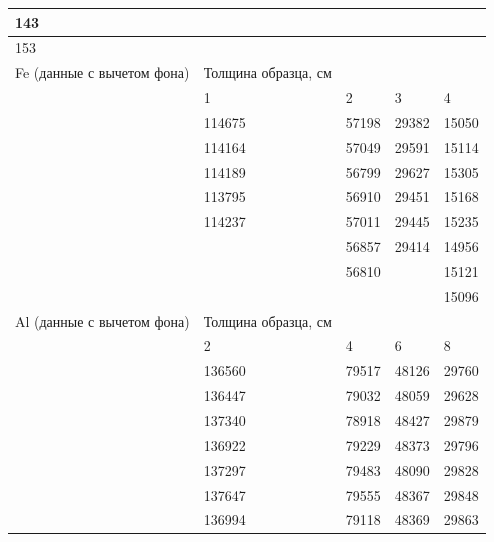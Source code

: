 \documentclass[%
reprint,
amsmath,amssymb,
aps,
]{revtex4-2}
\begin{document}
\begin{table}[]
\begin{tabular}{|l|l|l|l|l|}
			143                        &                     &                  &                  &       \\ \hline
			153                        &                     &                  &                  &       \\ \hline
			Fe (данные с вычетом фона) & Толщина образца, см &                  &                  &       \\ \hline
			& 1                   & 2                & 3                & 4     \\ \hline
			& 114675              & 57198            & 29382            & 15050 \\ \hline
			& 114164              & 57049            & 29591            & 15114 \\ \hline
			& 114189              & 56799            & 29627            & 15305 \\ \hline
			& 113795              & 56910            & 29451            & 15168 \\ \hline
			& 114237              & 57011            & 29445            & 15235 \\ \hline
			&                     & 56857            & 29414            & 14956 \\ \hline
			&                     & 56810            &                  & 15121 \\ \hline
			&                     &                  &                  & 15096 \\ \hline
			Al (данные с вычетом фона) & Толщина образца, см &                  &                  &       \\ \hline
			& 2                   & 4                & 6                & 8     \\ \hline
			& 136560              & 79517            & 48126            & 29760 \\ \hline
			& 136447              & 79032            & 48059            & 29628 \\ \hline
			& 137340              & 78918            & 48427            & 29879 \\ \hline
			& 136922              & 79229            & 48373            & 29796 \\ \hline
			& 137297              & 79483            & 48090            & 29828 \\ \hline
			& 137647              & 79555            & 48367            & 29848 \\ \hline
			& 136994              & 79118            & 48369            & 29863 \\ \hline

\end{tabular}
\end{table}
\end{document}
